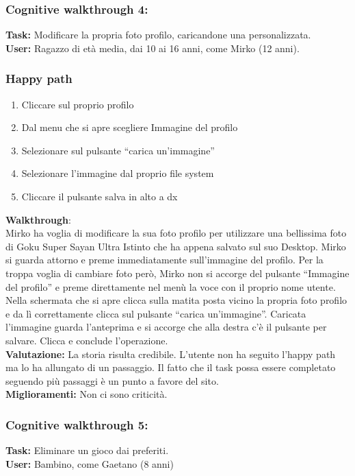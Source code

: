\documentclass[../Report.tex]{subfiles}
\begin{document}
    \subsubsection{Cognitive walkthrough 4:}
    \textbf{Task:} Modificare la propria foto profilo, caricandone una personalizzata.
    \\
    \textbf{User:} Ragazzo di età media, dai 10 ai 16 anni, come Mirko (12 anni).
    \subsubsection{Happy path}
    \begin{enumerate}
        \item Cliccare sul proprio profilo
        \item Dal menu che si apre scegliere Immagine del profilo 
        \item Selezionare sul pulsante  “carica un’immagine”
        \item Selezionare l’immagine dal proprio file system
        \item Cliccare il pulsante salva in alto a dx
        
    \end{enumerate}
    \textbf{Walkthrough}:\\
    Mirko ha voglia di modificare la sua foto profilo per utilizzare una bellissima foto di Goku Super Sayan Ultra Istinto che ha appena salvato sul suo Desktop. Mirko si guarda attorno e preme immediatamente sull’immagine del profilo. Per la troppa voglia di cambiare foto però, Mirko non si accorge del pulsante “Immagine del profilo” e preme direttamente nel menù la voce con il proprio nome utente. Nella schermata che si apre clicca sulla matita posta vicino la propria foto profilo e da lì correttamente clicca sul pulsante  “carica un’immagine”. Caricata l’immagine guarda l’anteprima e si accorge che alla destra c’è il pulsante per salvare. Clicca e conclude l’operazione.\\

    \textbf{Valutazione:} La storia risulta credibile. L’utente non ha seguito l’happy path ma lo ha allungato di un passaggio. Il fatto che il task possa essere completato seguendo più passaggi è un punto a favore del sito.\\

    \textbf{Miglioramenti:} Non ci sono criticità.

    
    \subsubsection{Cognitive walkthrough 5:}
    \textbf{Task:} Eliminare un gioco dai preferiti.\\
    \textbf{User:} Bambino, come Gaetano (8 anni)
\end{document}

